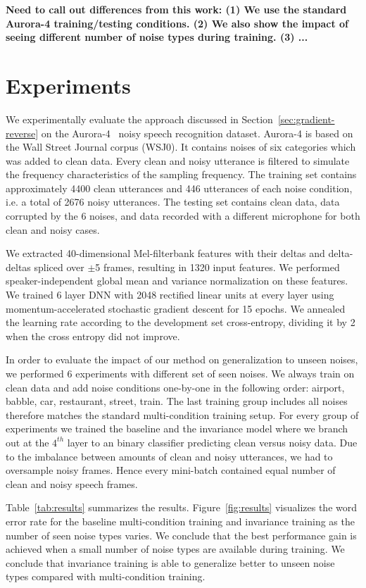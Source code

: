 \documentclass{article}
\begin{document}
    {\bf Need to call out differences from this work: (1) We use the standard Aurora-4 training/testing conditions. (2) We also show the impact of seeing different number of noise types during training. (3) ...}

\section{Experiments}
\label{sec:experiments}
We experimentally evaluate the approach discussed in Section~\ref{sec:gradient-reverse} 
on the Aurora-4~\cite{parihar2002aurora} noisy speech recognition dataset. Aurora-4
is based on the Wall Street Journal corpus (WSJ0). It contains noises of 
six categories which was added to clean
data. Every clean and noisy utterance is filtered to simulate the frequency characteristics of the sampling frequency. 
%
The training
set contains approximately 4400 clean utterances and 446 utterances of each noise condition,
i.e. a total of 2676 noisy utterances.
The testing
set contains clean data, data corrupted by the 6 noises, and data recorded with a different microphone
for both clean and noisy cases.

We extracted 40-dimensional Mel-filterbank features with their deltas and 
delta-deltas spliced over $\pm$5 frames, resulting in 1320 input 
features. We performed speaker-independent global mean and variance normalization on these features. We trained 6 layer
DNN with 2048 rectified linear units at every layer using momentum-accelerated stochastic gradient descent for 15 epochs. We annealed the learning rate according 
to the development set cross-entropy, dividing it by 2 when the cross entropy did not improve.

In order to evaluate the impact of our method on generalization to unseen noises,
we performed 6 experiments with different set of seen noises. We always train
on clean data and add noise conditions one-by-one in the following order: airport, babble, car, 
restaurant, street, train. The last training group includes all noises therefore matches the
standard multi-condition training setup. For every group of experiments we trained the
baseline and the invariance model where we branch out at the $4^{th}$ layer to an  
binary classifier predicting clean versus noisy data. Due to the imbalance between amounts of clean and
noisy utterances, we had to oversample noisy frames. Hence every mini-batch contained
equal number of clean and noisy speech frames.

Table~\ref{tab:results} summarizes the results. Figure~\ref{fig:results} visualizes the word error rate for the baseline multi-condition training and invariance training as the number of seen noise types varies. We conclude that the best performance
gain is achieved when a small number of noise types are available during training. We conclude that invariance training is able to generalize better to unseen noise types compared with multi-condition training.
\end{document}
